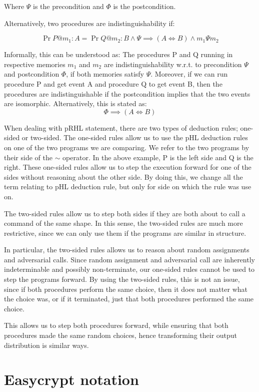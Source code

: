 Where $\Psi$ is the precondition and $\Phi$ is the postcondition.

Alternatively, two procedures are indistinguishability if:

\[
  \Pr{P @ m_{1} : A} = \Pr{Q @ m_{2} : B} \land \Psi \implies (A \iff B) \land m_{1} \Psi m_{2}
\]

Informally, this can be understood as: The procedures P and Q running in
respective memories $m_{1}$ and $m_{2}$ are indistinguishability w.r.t. to
precondition $\Psi$ and postcondition $\Phi$, if both memories satisfy $\Psi$.
Moreover, if we can run procedure P and get event A and
procedure Q to get event B, then the procedures are indistinguishable if the
postcondition implies that the two events are isomorphic. Alternatively, this is
stated as:
\[
  \Phi \implies (A \iff B)
\]


When dealing with pRHL statement, there are two types of deduction rules;
one-sided or two-sided.
The one-sided rules allow us to use the pHL deduction rules on one of the
two programs we are comparing. We refer to the two programs by their
side of the $\sim$ operator. In the above example, P is the left side and Q is
the right.
These one-sided rules allow us to step the execution forward for one of the sides without
reasoning about the other side.
By doing this, we change all the term relating to pHL deduction rule, but only
for side on which the rule was use on.

The two-sided rules allow us to step both sides if they are both about to call
a command of the same shape. In this sense, the two-sided rules are much more
restrictive, since we can only use them if the programs are similar in structure.

In particular, the two-sided rules allows us to reason about random assignments
and adversarial calls.
Since random assignment and adversarial call are inherently indeterminable and possibly
non-terminate, our one-sided rules cannot be used to step the programs forward.
By using the two-sided rules, this is not an issue,
since if both procedures perform the same choice, then it does not
matter what the choice was, or if it terminated, just that both procedures
performed the same choice.

This allows us to step both procedures forward, while ensuring that both
procedures made the same random choices, hence transforming their output
distribution is similar ways.

\section{Easycrypt notation}
\label{sec:label}

